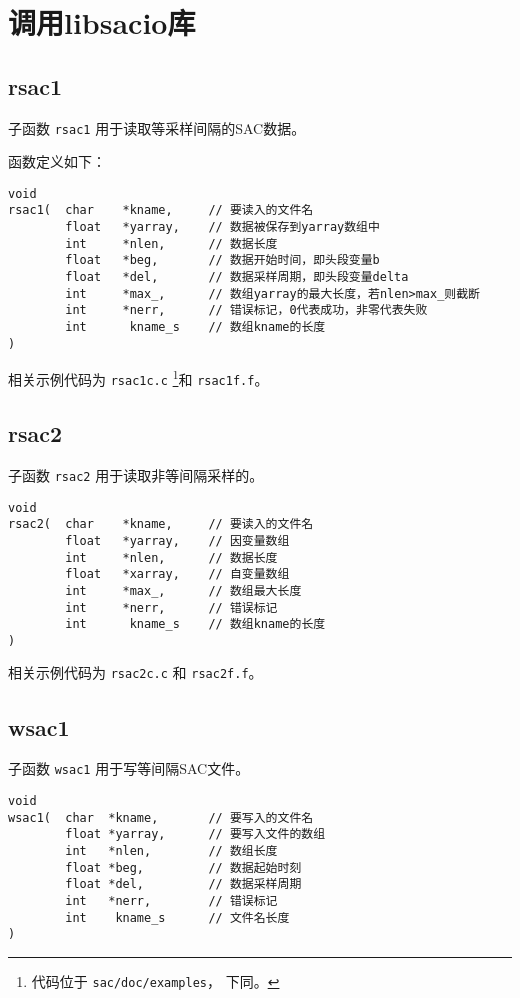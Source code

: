 \section{调用libsacio库}
\label{sec:libsacio}
\subsection{rsac1}
子函数 \texttt{rsac1} 用于读取等采样间隔的SAC数据。

函数定义如下：
\begin{verbatim}
void
rsac1(  char    *kname,     // 要读入的文件名
        float   *yarray,    // 数据被保存到yarray数组中
        int     *nlen,      // 数据长度
        float   *beg,       // 数据开始时间，即头段变量b
        float   *del,       // 数据采样周期，即头段变量delta
        int     *max_,      // 数组yarray的最大长度，若nlen>max_则截断
        int     *nerr,      // 错误标记，0代表成功，非零代表失败
        int      kname_s    // 数组kname的长度
)
\end{verbatim}

相关示例代码为 \texttt{rsac1c.c} \footnote{代码位于 \texttt{sac/doc/examples}，
下同。}和 \texttt{rsac1f.f}。

\subsection{rsac2}
子函数 \texttt{rsac2} 用于读取非等间隔采样的。
\begin{verbatim}
void
rsac2(  char    *kname,     // 要读入的文件名
        float   *yarray,    // 因变量数组
        int     *nlen,      // 数据长度
        float   *xarray,    // 自变量数组
        int     *max_,      // 数组最大长度
        int     *nerr,      // 错误标记
        int      kname_s    // 数组kname的长度
)
\end{verbatim}
相关示例代码为 \texttt{rsac2c.c} 和 \texttt{rsac2f.f}。

\subsection{wsac1}
子函数 \texttt{wsac1} 用于写等间隔SAC文件。
\begin{verbatim}
void
wsac1(  char  *kname,       // 要写入的文件名
        float *yarray,      // 要写入文件的数组
        int   *nlen,        // 数组长度
        float *beg,         // 数据起始时刻
        float *del,         // 数据采样周期
        int   *nerr,        // 错误标记
        int    kname_s      // 文件名长度
)
\end{verbatim}

